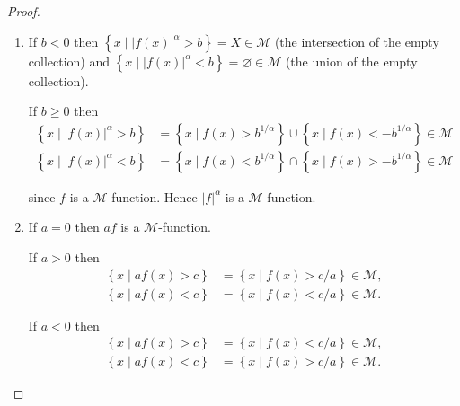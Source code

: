 \begin{proof}
    \begin{enumerate}[label={(\arabic*)}]
        \item If \( b < 0 \) then \( \left\{ x \mid {\left\vert f(x) \right\vert}^{\alpha} > b \right\} = X \in \mathscr{M} \) (the intersection of the empty collection) and \( \left\{ x \mid {\left\vert f(x) \right\vert}^{\alpha} < b \right\} = \varnothing \in \mathscr{M} \) (the union of the empty collection).

              If \( b \ge 0 \) then
              \begingroup
              \allowdisplaybreaks%
              \begin{align*}
                  \left\{ x \mid {\left\vert f(x) \right\vert}^{\alpha} > b \right\} & = \left\{ x \mid f(x) > b^{1/\alpha} \right\} \cup \left\{ x \mid f(x) < -b^{1/\alpha} \right\} \in \mathscr{M} \\
                  \left\{ x \mid {\left\vert f(x) \right\vert}^{\alpha} < b \right\} & = \left\{ x \mid f(x) < b^{1/\alpha} \right\} \cap \left\{ x \mid f(x) > -b^{1/\alpha} \right\} \in \mathscr{M}
              \end{align*}
              \endgroup

              since \( f \) is a \( \mathscr{M} \)-function. Hence \( {\left\vert f \right\vert}^{\alpha} \) is a \( \mathscr{M} \)-function.
        \item If \( a = 0 \) then \( af \) is a \( \mathscr{M} \)-function.

              If \( a > 0 \) then
              \begingroup
              \allowdisplaybreaks%
              \begin{align*}
                  \left\{ x \mid af(x) > c \right\} & = \left\{ x \mid f(x) > c/a \right\} \in \mathscr{M}, \\
                  \left\{ x \mid af(x) < c \right\} & = \left\{ x \mid f(x) < c/a \right\} \in \mathscr{M}.
              \end{align*}
              \endgroup

              If \( a < 0 \) then
              \begingroup
              \allowdisplaybreaks%
              \begin{align*}
                  \left\{ x \mid af(x) > c \right\} & = \left\{ x \mid f(x) < c/a \right\} \in \mathscr{M}, \\
                  \left\{ x \mid af(x) < c \right\} & = \left\{ x \mid f(x) > c/a \right\} \in \mathscr{M}.
              \end{align*}
              \endgroup


\end{enumerate}
\end{proof}
